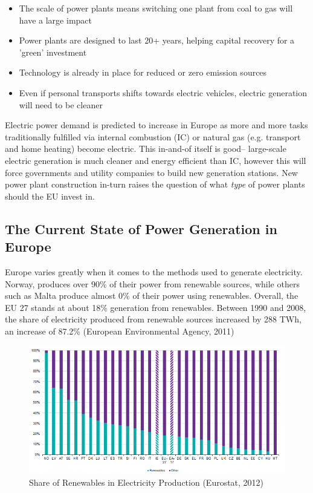 \documentclass{article}
\begin{document}
\begin{itemize}
	\item The scale of power plants means switching one plant from coal to gas will have a large impact
	\item Power plants are designed to last 20+ years, helping capital recovery for a 'green' investment
	\item Technology is already in place for reduced or zero emission sources
	\item Even if personal transports shifts towards electric vehicles, electric generation will need to be cleaner 
\end{itemize}

Electric power demand is predicted to increase in Europe as more and more tasks traditionally fulfilled via internal combustion (IC) or natural gas (e.g. transport and home heating) become electric. This in-and-of itself is good-- large-scale electric generation is much cleaner and energy efficient than IC, however this will force governments and utility companies to build new generation stations. New power plant construction in-turn raises the question of what \emph{type} of power plants should the EU invest in. 

\subsection{The Current State of Power Generation in Europe}
Europe varies greatly when it comes to the methods used to generate electricity. Norway, produces over 90\% of their power from renewable sources, while others such as Malta produce almost 0\% of their power using renewables. Overall, the EU 27 stands at about 18\% generation from renewables. Between 1990 and 2008, the share of electricity produced from renewable sources increased by 288 TWh, an increase of 87.2\% (European Environmental Agency, 2011) 

\begin{figure}[H]
	\begin{center}
	\includegraphics[scale = .6]{Figures/percentrenew.png}
	\caption{Share of Renewables in Electricity Production (Eurostat, 2012)}
	\end{center}
\end{figure}
\end{document}
